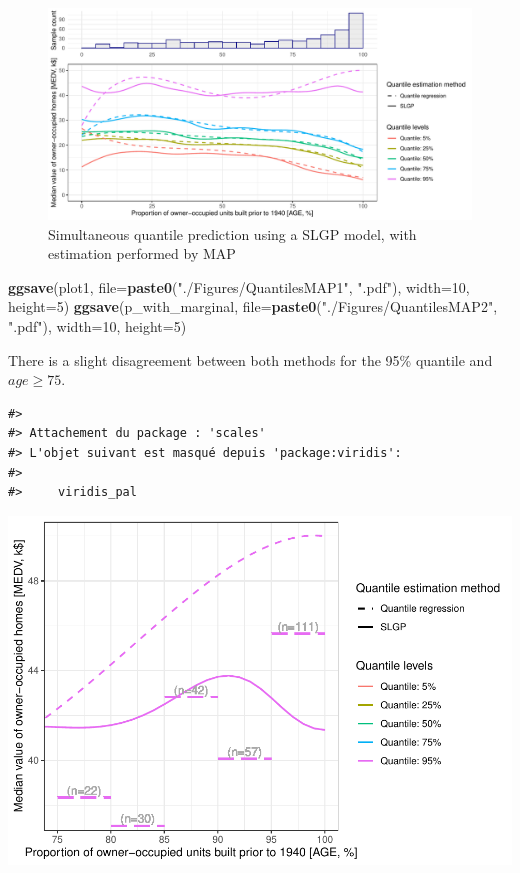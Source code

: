 \documentclass[
]{article}
\newenvironment{Shaded}{\begin{snugshade}}{\end{snugshade}}
\newcommand{\AttributeTok}[1]{\textcolor[rgb]{0.13,0.29,0.53}{#1}}
\newcommand{\DecValTok}[1]{\textcolor[rgb]{0.00,0.00,0.81}{#1}}
\newcommand{\FunctionTok}[1]{\textcolor[rgb]{0.13,0.29,0.53}{\textbf{#1}}}
\newcommand{\NormalTok}[1]{#1}
\newcommand{\StringTok}[1]{\textcolor[rgb]{0.31,0.60,0.02}{#1}}
\begin{document}
\begin{figure}[H]

{\centering \includegraphics{IntroductionSLGP_files/figure-latex/SLGPMCMCplotQuantiles-1} 

}

\caption{Simultaneous quantile prediction using a SLGP model, with estimation performed by MAP}\label{fig:SLGPMCMCplotQuantiles}
\end{figure}

\begin{Shaded}
\begin{Highlighting}[]
\FunctionTok{ggsave}\NormalTok{(plot1, }\AttributeTok{file=}\FunctionTok{paste0}\NormalTok{(}\StringTok{"./Figures/QuantilesMAP1"}\NormalTok{,  }\StringTok{".pdf"}\NormalTok{), }\AttributeTok{width=}\DecValTok{10}\NormalTok{, }\AttributeTok{height=}\DecValTok{5}\NormalTok{)}
\FunctionTok{ggsave}\NormalTok{(p\_with\_marginal, }\AttributeTok{file=}\FunctionTok{paste0}\NormalTok{(}\StringTok{"./Figures/QuantilesMAP2"}\NormalTok{,  }\StringTok{".pdf"}\NormalTok{), }\AttributeTok{width=}\DecValTok{10}\NormalTok{, }\AttributeTok{height=}\DecValTok{5}\NormalTok{)}
\end{Highlighting}
\end{Shaded}

There is a slight disagreement between both methods for the 95\% quantile and \(age \geq 75\).

\begin{verbatim}
#> 
#> Attachement du package : 'scales'
#> L'objet suivant est masqué depuis 'package:viridis':
#> 
#>     viridis_pal
\end{verbatim}

\includegraphics{IntroductionSLGP_files/figure-latex/unnamed-chunk-3-1.pdf}
\end{document}
